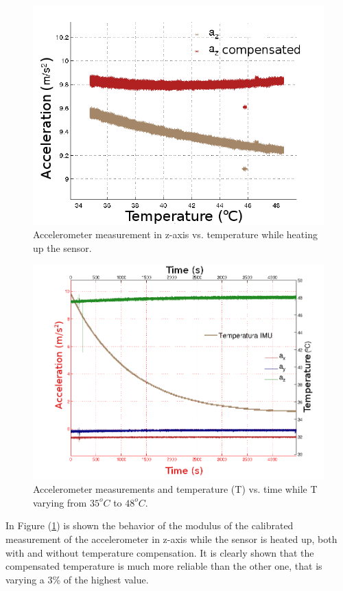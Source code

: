 \documentclass[conference]{IEEEtran}
\newcommand{\refp}[1]{(\ref{#1})}
\begin{document}
\begin{figure}
	\centering
	\includegraphics[width=.8\columnwidth]{./pics_paper/resultado_temp.png}
	\caption{\textbf{}Accelerometer measurement in z-axis vs. temperature while heating up the sensor.}
	\label{fig:resultado_temp}
\end{figure}
\begin{figure}
	\centering
	\includegraphics[width=.8\columnwidth]{./pics_paper/bajada.png}
	\caption{\textbf{}Accelerometer measurements and temperature (T) vs. time while T varying from $35^oC$ to $48^oC$.}
	\label{fig:bajada}
\end{figure}

\balance
In Figure \refp{fig:resultado_temp} is shown the behavior of the modulus of the calibrated
measurement of the accelerometer in z-axis while the sensor is
heated up, both with and without temperature compensation.
It is clearly shown that the compensated temperature is much
more reliable than the other one, that is varying a 3\% of the
highest value.\\
\end{document}
